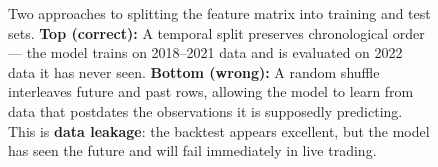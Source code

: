 \begin{figure}[ht]
\begin{tikzpicture}[
  font=\sffamily\small,
  bar/.style={rectangle, minimum height=1.1cm, inner sep=0},
]
\end{tikzpicture}

\caption{%
  Two approaches to splitting the feature matrix into training and test sets.
  \textbf{Top (correct):} A temporal split preserves chronological order --- the
  model trains on 2018--2021 data and is evaluated on 2022 data it has never seen.
  \textbf{Bottom (wrong):} A random shuffle interleaves future and past rows,
  allowing the model to learn from data that postdates the observations it is
  supposedly predicting. This is \textbf{data leakage}: the backtest appears
  excellent, but the model has seen the future and will fail immediately in
  live trading.%
}
\label{fig:training-data-split}
\label{fig:train-test-split}
\end{figure}